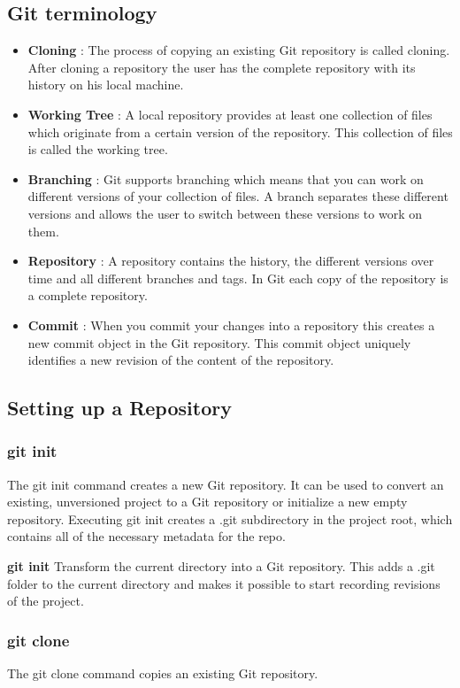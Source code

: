 \documentclass{article}
\begin{document}
	\subsection{Git terminology}
	\begin{itemize}
	    \item \textbf{Cloning} : The process of copying an existing Git repository is called cloning. After cloning a repository the user has the complete repository with its history on his local machine. 
	    \item \textbf{Working Tree} : A local repository provides at least one collection of files which originate from a certain version of the repository. This collection of files is called the working tree.
	    \item \textbf{Branching} : Git supports branching which means that you can work on different versions of your collection of files. A branch separates these different versions and allows the user to switch between these versions to work on them.
	    \item \textbf{Repository} : A repository contains the history, the different versions over time and all different branches and tags. In Git each copy of the repository is a complete repository.
	    \item \textbf{Commit} : When you commit your changes into a repository this creates a new commit object in the Git repository. This commit object uniquely identifies a new revision of the content of the repository.
	\end{itemize}
	
	\subsection{Setting up a Repository}
	\subsubsection{git init}
	    The git init command creates a new Git repository. It can be used to convert an existing, unversioned project to a Git repository or initialize a new empty repository.  Executing git init creates a .git subdirectory in the project root, which contains all of the necessary metadata for the repo. 
	   
	    \textbf{git init}
	    Transform the current directory into a Git repository. This adds a .git folder to the current directory and makes it possible to start recording revisions of the project.
		
	\subsubsection{git clone}
	    The git clone command copies an existing Git repository. 
	    
\end{document}
